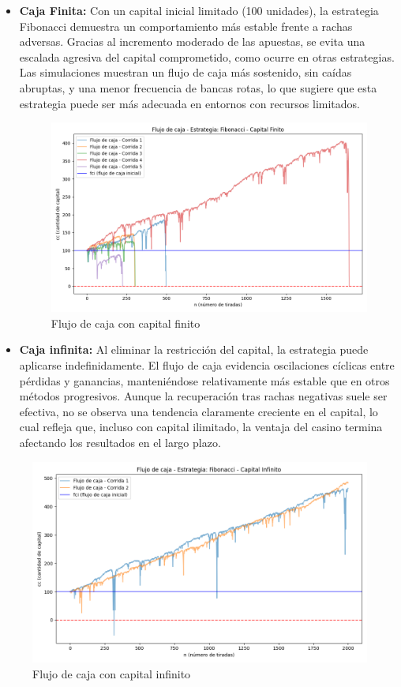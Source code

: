 \documentclass{article}
\begin{document}
\begin{itemize}
    \item \textbf{Caja Finita:} Con un capital inicial limitado (100 unidades), la estrategia Fibonacci demuestra un comportamiento más estable frente a rachas adversas. Gracias al incremento moderado de las apuestas, se evita una escalada agresiva del capital comprometido, como ocurre en otras estrategias. Las simulaciones muestran un flujo de caja más sostenido, sin caídas abruptas, y una menor frecuencia de bancas rotas, lo que sugiere que esta estrategia puede ser más adecuada en entornos con recursos limitados.
    \begin{figure}[H]
        \centering \includegraphics[width=0.7\linewidth]{Imagenes/flujo_caja_Fibonacci_f.png}
        \caption{Flujo de caja con capital finito}
        \label{fig:enter-label}
    \end{figure}
\end{itemize}

\begin{itemize}
    \item \textbf{Caja infinita:} Al eliminar la restricción del capital, la estrategia puede aplicarse indefinidamente. El flujo de caja evidencia oscilaciones cíclicas entre pérdidas y ganancias, manteniéndose relativamente más estable que en otros métodos progresivos. Aunque la recuperación tras rachas negativas suele ser efectiva, no se observa una tendencia claramente creciente en el capital, lo cual refleja que, incluso con capital ilimitado, la ventaja del casino termina afectando los resultados en el largo plazo.
\end{itemize}
\begin{figure}[H]
    \centering
    \includegraphics[width=0.7\linewidth]{Imagenes/flujo_caja_Fibonacci_i.png}
    \caption{Flujo de caja con capital infinito}
    \label{fig:enter-label}
\end{figure}
\end{document}

